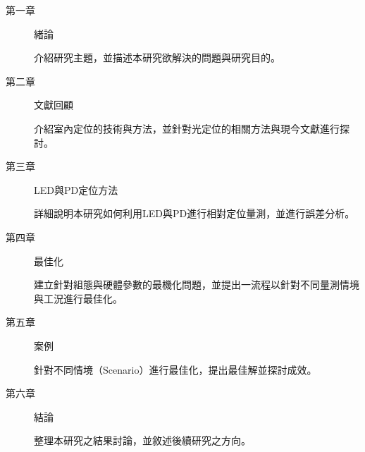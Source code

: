 \begin{description}
    \item[第一章] 緒論
    
    介紹研究主題，並描述本研究欲解決的問題與研究目的。
    
    \item[第二章] 文獻回顧
    
    介紹室內定位的技術與方法，並針對光定位的相關方法與現今文獻進行探討。
    
    \item[第三章] LED與PD定位方法
    
    詳細說明本研究如何利用LED與PD進行相對定位量測，並進行誤差分析。
    
    \item[第四章] 最佳化
    
    建立針對組態與硬體參數的最機化問題，並提出一流程以針對不同量測情境與工況進行最佳化。
    
    \item[第五章] 案例
    
    針對不同情境（Scenario）進行最佳化，提出最佳解並探討成效。
    
    \item[第六章] 結論
    
    整理本研究之結果討論，並敘述後續研究之方向。
    
    \end{description}







